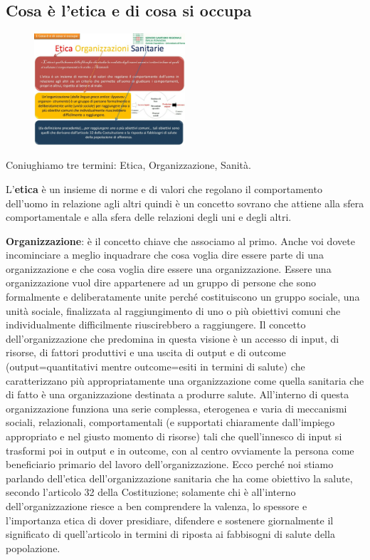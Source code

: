 \subsection{Cosa è l'etica e di cosa si occupa}

 \begin{figure}[!ht]
\centering
	\includegraphics[width=0.5\textwidth]{32/image3.jpeg}
	\end{figure}

Coniughiamo tre termini: Etica, Organizzazione, Sanità.

L'\textbf{etica} è un insieme di norme e di valori che regolano il
comportamento dell'uomo in relazione agli altri quindi è un concetto
sovrano che attiene alla sfera comportamentale e alla sfera delle
relazioni degli uni e degli altri.

\textbf{Organizzazione}: è il concetto chiave che associamo al primo.
Anche voi dovete incominciare a meglio inquadrare che cosa voglia dire
essere parte di una organizzazione e che cosa voglia dire essere una
organizzazione. Essere una organizzazione vuol dire appartenere ad un
gruppo di persone che sono formalmente e deliberatamente unite perché
costituiscono un gruppo sociale, una unità sociale, finalizzata al
raggiungimento di uno o più obiettivi comuni che individualmente
difficilmente riuscirebbero a raggiungere. Il concetto
dell'organizzazione che predomina in questa visione è un accesso di
input, di risorse, di fattori produttivi e una uscita di output e di
outcome (output=quantitativi mentre outcome=esiti in termini di salute)
che caratterizzano più appropriatamente una organizzazione come quella
sanitaria che di fatto è una organizzazione destinata a produrre salute.
All'interno di questa organizzazione funziona una serie complessa,
eterogenea e varia di meccanismi sociali, relazionali, comportamentali
(e supportati chiaramente dall'impiego appropriato e nel giusto momento
di risorse) tali che quell'innesco di input si trasformi poi in output e
in outcome, con al centro ovviamente la persona come beneficiario
primario del lavoro dell'organizzazione. Ecco perché noi stiamo parlando
dell'etica dell'organizzazione sanitaria che ha come obiettivo la
salute, secondo l'articolo 32 della Costituzione; solamente chi è
all'interno dell'organizzazione riesce a ben comprendere la valenza, lo
spessore e l'importanza etica di dover presidiare, difendere e sostenere
giornalmente il significato di quell'articolo in termini di riposta ai
fabbisogni di salute della popolazione.

